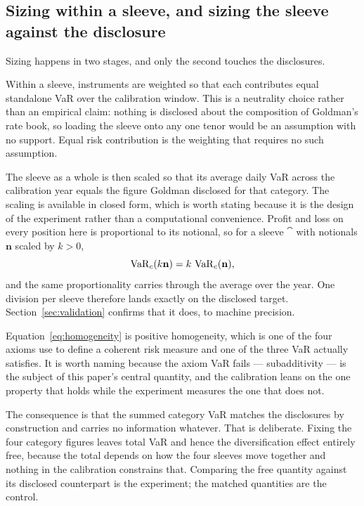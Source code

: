 \subsection{Sizing within a sleeve, and sizing the sleeve against the disclosure}

Sizing happens in two stages, and only the second touches the disclosures.

Within a sleeve, instruments are weighted so that each contributes equal
standalone VaR over the calibration window. This is a neutrality choice rather
than an empirical claim: nothing is disclosed about the composition of
Goldman's rate book, so loading the sleeve onto any one tenor would be an
assumption with no support. Equal risk contribution is the weighting that
requires no such assumption.

The sleeve as a whole is then scaled so that its average daily VaR across the
calibration year equals the figure Goldman disclosed for that category. The
scaling is available in closed form, which is worth stating because it is the
design of the experiment rather than a computational convenience. Profit and
loss on every position here is proportional to its notional, so for a sleeve
$\cat$ with notionals $\mathbf{n}$ scaled by $k > 0$,
\begin{equation}
\operatorname{VaR}_{c}(k\mathbf{n}) = k \, \operatorname{VaR}_{c}(\mathbf{n}) ,
\label{eq:homogeneity}
\end{equation}
and the same proportionality carries through the average over the year. One
division per sleeve therefore lands exactly on the disclosed target.
Section~\ref{sec:validation} confirms that it does, to machine precision.

Equation~\eqref{eq:homogeneity} is positive homogeneity, which is one of the
four axioms \citet{artzner1999coherent} use to define a coherent risk measure
and one of the three VaR actually satisfies. It is worth naming because the
axiom VaR fails --- subadditivity --- is the subject of this paper's central
quantity, and the calibration leans on the one property that holds while the
experiment measures the one that does not.

The consequence is that the summed category VaR matches the disclosures by
construction and carries no information whatever. That is deliberate. Fixing
the four category figures leaves total VaR and hence the diversification effect
entirely free, because the total depends on how the four sleeves move together
and nothing in the calibration constrains that. Comparing the free quantity
against its disclosed counterpart is the experiment; the matched quantities are
the control.

